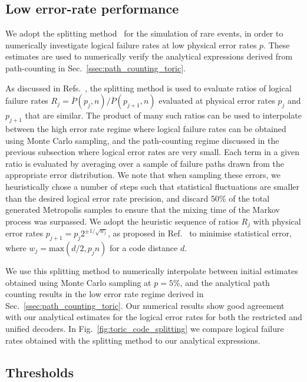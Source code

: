 \documentclass[a4paper,twocolumn,11pt,accepted=2024-12-23]{quantumarticle}
\begin{document}
\subsection{\label{ssec:splitting} Low error-rate performance} 



We adopt the splitting method~\cite{Bravyi_2013} for the simulation of rare events, in order to numerically investigate logical failure rates at low physical error rates $p$. These estimates are used to numerically verify the analytical expressions derived from path-counting in Sec.~\ref{ssec:path_counting_toric}. 

As discussed in Refs.~\cite{Bravyi_2013,beverland2019role}, the splitting method is used to evaluate ratios of logical failure rates $R_j = \overline{P}(p_j, n) / \overline{P}(p_{j+1}, n)$ evaluated at physical error rates $p_j$ and $p_{j+1}$ that are similar. The product of many such ratios can be used to interpolate between the high error rate regime where logical failure rates can be obtained using Monte Carlo sampling, and the path-counting regime discussed in the previous subsection where logical error rates are very small. Each term in a given ratio is evaluated by averaging over a sample of failure paths drawn from the appropriate error distribution. We note that when sampling these errors, we heuristically chose a number of steps such that statistical fluctuations are smaller than the desired logical error rate precision, and discard 50\% of the total generated Metropolis samples to ensure that the mixing
time of the Markov process was surpassed. We adopt the heuristic sequence of ratios $R_j$ with physical error rates $p_{j+1}=p_j2^{\pm1/\sqrt{w_j}}$, as proposed in Ref.~\cite{Bravyi_2013} to minimise statistical error, where $w_j=\text{max}(d/2,p_jn)$ for a code distance $d$. 

We use this splitting method to numerically interpolate between initial estimates obtained using Monte Carlo sampling at $p = 5\%$, and the analytical path counting results in the low error rate regime derived in Sec.~\ref{ssec:path_counting_toric}. Our numerical results show good agreement with our analytical estimates for the logical error rates for both the restricted and unified decoders. In Fig.~\ref{fig:toric_code_splitting} we compare logical failure rates obtained with the splitting method to our analytical expressions. 



\subsection{Thresholds}\label{ssec:toric_high_ler} 
\end{document}
